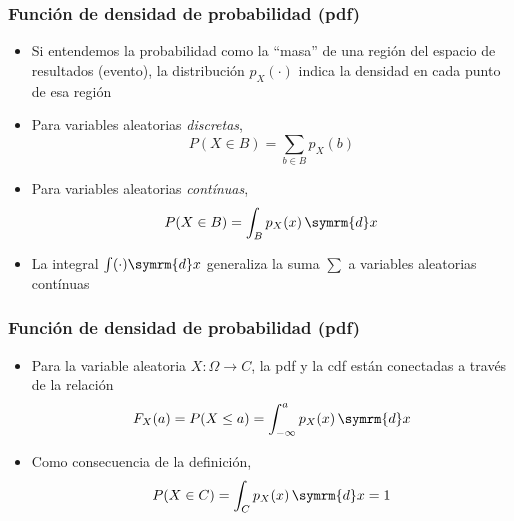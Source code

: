 \documentclass[xcolor=dvipsnames,10pt]{beamer}
\begin{document}
%
\begin{frame}
  \frametitle{Función de densidad de probabilidad (pdf)}
  \begin{itemize}
  \item Si entendemos la probabilidad como la ``masa'' de una región del espacio de resultados (evento), la distribución $p_X(\cdot)$ indica la densidad en cada punto de esa región
  \item Para variables aleatorias \emph{discretas},
    \begin{equation*}
      P(X \in B) = \sum_{b \in B } p_X(b)
    \end{equation*}
  \item Para variables aleatorias \emph{contínuas},
    \begin{equation*}
      P(X \in B) = \int_B p_X(x) \, \symrm{d} x
    \end{equation*}
  \item La integral $\int (\cdot) \symrm{d} x$ generaliza la suma $\sum$ a variables aleatorias contínuas
  \end{itemize}
\end{frame}
%
\begin{frame}
  \frametitle{Función de densidad de probabilidad (pdf)}

  \begin{itemize}
  \item Para la variable aleatoria $X \colon \Omega \to C$, la pdf y la cdf están conectadas a través de la relación
    \begin{equation*}
      F_X(a) = P(X \leq a) = \int^a_{-\infty} p_X(x) \, \symrm{d} x
    \end{equation*}
  \item Como consecuencia de la definición,
    \begin{equation*}
      P(X \in C) = \int_C p_X(x) \, \symrm{d} x = 1
    \end{equation*}
  \end{itemize}
\end{frame}
%
\begin{frame}
  \pythonframe
\end{frame}
%
\end{document}
